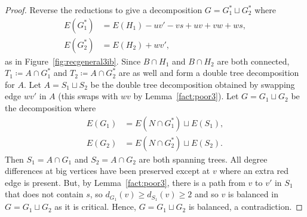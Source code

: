 \documentclass[11pt, reqno, a4paper]{article}
\theoremstyle{definition}
\numberwithin{equation}{section}
\renewcommand{\geq}{\geqslant}
\begin{document}
\begin{proof}
Reverse the reductions to give a decomposition $G=G_1^{\ast}\sqcup G_2^{\ast}$ where 
\begin{align*}
E(G_1^{\ast}) &= E(H_1) - uv' - vs + uv + vw + ws, \\
E(G_2^{\ast}) &= E(H_2) + wv',
\end{align*}
as in Figure~\ref{fig:recgeneral3ib}.
Since $B\cap H_1$ and $B\cap H_2$ are both connected, $T_1 \coloneqq A\cap G_1^{\ast}$ and $T_2 \coloneqq A\cap G_2^{\ast}$ are as well and form a double tree decomposition for $A$.
Let $A=S_1\sqcup S_2$ be the double tree decomposition obtained by swapping edge $wv'$ in $A$ (this swaps with $wv$ by Lemma~\ref{fact:poor3}).
Let $G = G_1\sqcup G_2$ be the decomposition where
\begin{align*}
E(G_1) &= E(N\cap G_1^{\ast}) \sqcup E(S_1),\\
E(G_2) &= E(N\cap G_2^{\ast}) \sqcup E(S_2).
\end{align*}
Then $S_1 = A\cap G_1$ and $S_2 = A\cap G_2$ are both spanning trees.
All degree differences at big vertices have been preserved except at \(v\) where an extra red edge is present. But, by Lemma~\ref{fact:poor3}, there is a path from $v$ to $v'$ in $S_1$ that does not contain $s$, so $d_{G_1}(v) \geq d_{S_1}(v) \geq 2$ and so $v$ is balanced in $G= G_1\sqcup G_2$ as it is critical.
Hence, $G = G_1\sqcup G_2$ is balanced, a contradiction.
\end{proof}
\end{document}
